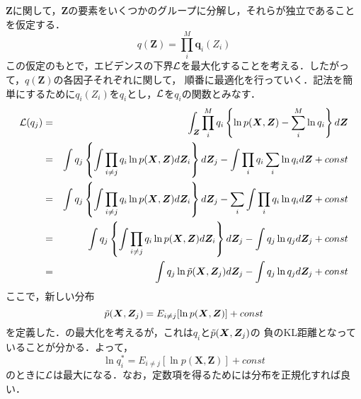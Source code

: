$\bm Z$に関して，$\bm Z$の要素をいくつかのグループに分解し，それらが独立であることを仮定する．
\begin{equation}
  q(\bm Z) = \prod^M_i\bm q_i(Z_i)
\end{equation}
この仮定のもとで，エビデンスの下界${\cal L}$を最大化することを考える．したがって，$q(\bm Z)$の各因子それぞれに関して，
順番に最適化を行っていく．記法を簡単にするために$q_i(Z_i)$を$q_i$とし，${\cal L}$を$q_i$の関数とみなす．
\begin{eqnarray}
  {\cal L}(q_j)
  &=& \int_{\bm Z}\prod^M_i q_i \left\{ \ln p (\bm X, \bm Z) - \sum^M_i \ln q_i \right\} d \bm Z \nonumber \\
  &=& \int q_j \left\{ \int \prod_{i \neq j} q_i \ln p (\bm X, \bm Z) d \bm Z_i \right\} d \bm Z_j
      - \int \prod_i q_i \sum_i \ln q_i d \bm Z + const \nonumber \\
  &=& \int q_j \left\{ \int \prod_{i \neq j} q_i \ln p (\bm X, \bm Z) d \bm Z_i \right\} d \bm Z_j
      - \sum_i \int \prod_i q_i \ln q_i d \bm Z + const \nonumber \\
  &=& \int q_j \left\{ \int \prod_{i \neq j} q_i \ln p (\bm X, \bm Z) d \bm Z_i \right\} d \bm Z_j
      - \int q_j \ln q_j d \bm Z_j + const \nonumber \\
  &=& \int q_j \ln \tilde{p}(\bm X, \bm Z_j) d \bm Z_j - \int q_j \ln q_j d \bm Z_j + const
  \label{eq:independent_L}
\end{eqnarray}
ここで，新しい分布
\begin{equation}
\tilde{p}(\bm X, \bm Z_j) = E_{i \neq j}[\ln p(\bm X, \bm Z)] + const 
\end{equation}
を定義した．の最大化を考えるが，これは$q_i$と$\tilde{p}(\bm X, \bm Z_j)$の
負のKL距離となっていることが分かる．よって，
\begin{equation}
  \ln q_i^* = E_{i \neq j}[\ln p(\bm X, \bm Z)] + const 
\end{equation}
のときに${\cal L}$は最大になる．なお，定数項を得るためには分布を正規化すれば良い．


